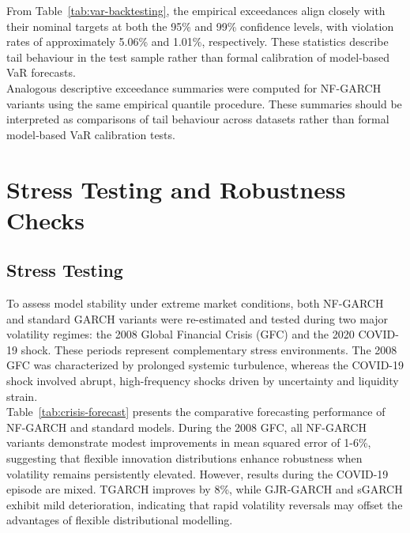 \documentclass[oneside,12pt]{CUEDthesisPSnPDF}
\begin{document}
From Table~\ref{tab:var-backtesting}, the empirical exceedances align closely with their nominal targets at both the 95\% and 99\% confidence levels, with violation rates of approximately 5.06\% and 1.01\%, respectively. These statistics describe tail behaviour in the test sample rather than formal calibration of model‑based VaR forecasts.\\

Analogous descriptive exceedance summaries were computed for NF-GARCH variants using the same empirical quantile procedure. These summaries should be interpreted as comparisons of tail behaviour across datasets rather than formal model‑based VaR calibration tests.\\


\section{Stress Testing and Robustness Checks}
\label{sec:stress_results}
\subsection{Stress Testing}
\noindent
To assess model stability under extreme market conditions, both NF-GARCH and standard GARCH variants were re-estimated and tested during two major volatility regimes: the 2008 Global Financial Crisis (GFC) and the 2020 COVID-19 shock. These periods represent complementary stress environments. The 2008 GFC was characterized by prolonged systemic turbulence, whereas the COVID-19 shock involved abrupt, high-frequency shocks driven by uncertainty and liquidity strain.\\

Table~\ref{tab:crisis-forecast} presents the comparative forecasting performance of NF-GARCH and standard models. During the 2008 GFC, all NF-GARCH variants demonstrate modest improvements in mean squared error of 1-6\%, suggesting that flexible innovation distributions enhance robustness when volatility remains persistently elevated. However, results during the COVID-19 episode are mixed. TGARCH improves by 8\%, while GJR-GARCH and sGARCH exhibit mild deterioration, indicating that rapid volatility reversals may offset the advantages of flexible distributional modelling.\\
\end{document}
